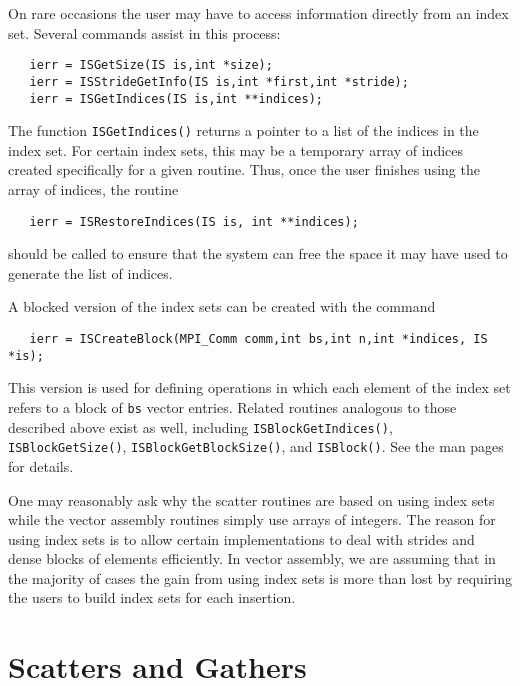 On rare occasions the user may have to access information directly 
from an index set.  
Several commands  
assist in this process:
\begin{verbatim}
   ierr = ISGetSize(IS is,int *size);
   ierr = ISStrideGetInfo(IS is,int *first,int *stride);
   ierr = ISGetIndices(IS is,int **indices);
\end{verbatim}
The function {\tt ISGetIndices()} returns a pointer to a list of the 
indices in the index set. 
For certain index sets, this may be a 
temporary array of indices created specifically for a given routine. 
Thus, once the user finishes using the array of indices, 
the routine 
\begin{verbatim}
   ierr = ISRestoreIndices(IS is, int **indices); 
\end{verbatim}
should be called to ensure that the system can free the space it 
may have used to generate the list of indices.

A blocked version of the index sets can be created with the command
\begin{verbatim}
   ierr = ISCreateBlock(MPI_Comm comm,int bs,int n,int *indices, IS *is);
\end{verbatim}
This version is used for defining operations in which each element of the index
set refers to a block of {\tt bs} vector entries.  Related routines analogous
to those described above exist as well, including
{\tt ISBlockGetIndices()}, {\tt ISBlockGetSize()}, {\tt ISBlockGetBlockSize()},
and {\tt ISBlock()}. See the man pages for details.
  

One may reasonably ask why the scatter routines are based on 
using index sets while the vector assembly routines simply use 
arrays of integers. The reason for using index sets is to allow certain 
implementations to deal with strides and dense blocks of elements 
efficiently. In vector assembly, we are assuming that in the majority of 
cases the gain from using index sets is more than lost by requiring 
the users to build index sets for each insertion. 

\section{Scatters and Gathers}  
\label{sec:scatter}

